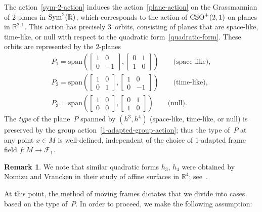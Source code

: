 \documentclass[pdftex]{sigma}
\numberwithin{equation}{section}
\theoremstyle{definition}
\newtheorem{rmk}[teo]{Remark}
\begin{document}
The action~\eqref{sym-2-action} induces the action~\eqref{plane-action} on the Grassmannian of 2-planes in ${\rm Sym}^2(\mathbb{R})$,
which corresponds to the action of ${\rm CSO}^+(2,1)$ on planes in $\mathbb{R}^{2,1}$.
This action has precisely 3~orbits, consisting of planes that are space-like, time-like, or null with respect to the
quadratic form~\eqref{quadratic-form}.
These orbits are represented by the 2-planes
\begin{gather}
P_1   = \text{span} \left( \begin{bmatrix} 1 & 0 \\  0 & -1 \end{bmatrix}, \begin{bmatrix} 0 & 1 \\  1 & 0 \end{bmatrix} \right)   \qquad   \text{(space-like)}, \nonumber\\
P_2   = \text{span} \left( \begin{bmatrix} 1 & 0 \\  0 & 1 \end{bmatrix}, \begin{bmatrix} 1 & 0 \\  0 & -1 \end{bmatrix} \right)   \qquad   \text{(time-like)}, \nonumber\\
P_3   = \text{span} \left( \begin{bmatrix} 1 & 0 \\  0 & 0 \end{bmatrix}, \begin{bmatrix} 0 & 1 \\  1 & 0 \end{bmatrix} \right)   \qquad    \text{(null)}.
 \label{normal-forms-planes}
\end{gather}
The {\em type} of the plane~$P$ spanned by $(h^3, h^4)$ (space-like, time-like, or null) is preserved by the group
action~\eqref{1-adapted-group-action}; thus the type of~$P$ at any point $x \in M$ is well-def\/ined, independent of the
choice of 1-adapted frame f\/ield $f:M \to \mathcal{F}_1$.

\begin{rmk}
We note that similar quadratic forms $h_3$, $h_4$ were obtained by Nomizu and Vrancken in their study of af\/f\/ine surfaces
in $\mathbb{R}^4$; see~\cite{NV93}.
\end{rmk}

At this point, the method of moving frames dictates that we divide into cases based on the type of~$P$.
In order to proceed, we make the following assumption:
\end{document}
